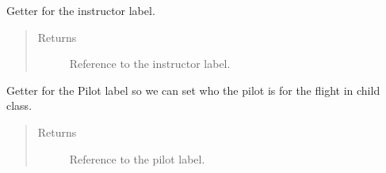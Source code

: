 \documentclass[letterpaper,10pt,english]{sphinxmanual}
\begin{document}
\begin{fulllineitems}
\begin{fulllineitems}
\begin{quote}
\begin{description}
\end{description}\end{quote}

\end{fulllineitems}


\begin{fulllineitems}
\label{\detokenize{index:src.Views.View_ReportScreen.ReportWindow.del_LblInstructor}}
Getter for the instructor label.
\begin{quote}\begin{description}
\item[{Returns}] \leavevmode
Reference to the instructor label.

\end{description}\end{quote}

\end{fulllineitems}


\begin{fulllineitems}
\label{\detokenize{index:src.Views.View_ReportScreen.ReportWindow.del_LblPilot}}
Getter for the Pilot label so we can set who the pilot is for the flight in child class.
\begin{quote}\begin{description}
\item[{Returns}] \leavevmode
Reference to the pilot label.

\end{description}\end{quote}

\end{fulllineitems}



\end{fulllineitems}
\end{document}
